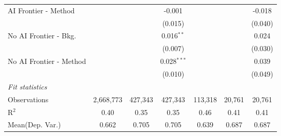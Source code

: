 \begin{tabular}{lcccccc}
   AI Frontier - Method    &               &               & -0.001        &               &               & -0.018\\   
                           &               &               & (0.015)       &               &               & (0.040)\\   
   No AI Frontier - Bkg.   &               &               & 0.016$^{**}$  &               &               & 0.024\\   
                           &               &               & (0.007)       &               &               & (0.030)\\   
   No AI Frontier - Method &               &               & 0.028$^{***}$ &               &               & 0.039\\   
                           &               &               & (0.010)       &               &               & (0.049)\\   
   \midrule
   \emph{Fit statistics}\\
   Observations            & 2,668,773     & 427,343       & 427,343       & 113,318       & 20,761        & 20,761\\  
   R$^2$                   & 0.40          & 0.35          & 0.35          & 0.46          & 0.41          & 0.41\\  
Mean(Dep. Var.) & 0.662 & 0.705 & 0.705 & 0.639 & 0.687 & 0.687 \\
   

\end{tabular}
